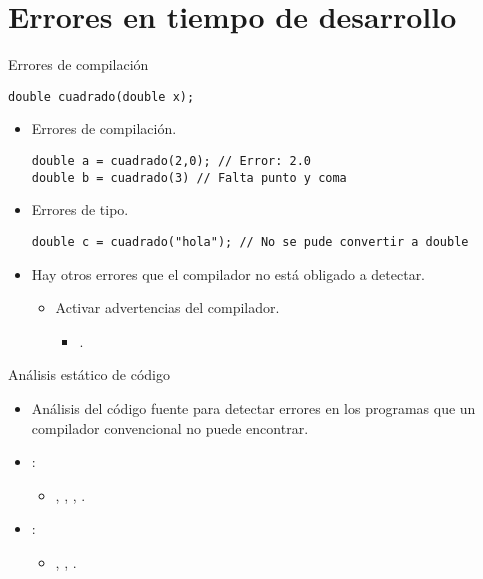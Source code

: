 \section{Errores en tiempo de desarrollo}

\begin{frame}[t,fragile]{Errores de compilación}
\begin{lstlisting}
double cuadrado(double x);
\end{lstlisting}

\begin{itemize}
  \item Errores de compilación.
\begin{lstlisting}
double a = cuadrado(2,0); // Error: 2.0
double b = cuadrado(3) // Falta punto y coma
\end{lstlisting}

  \item Errores de tipo.
\begin{lstlisting}
double c = cuadrado("hola"); // No se pude convertir a double
\end{lstlisting}

  \item Hay otros errores que el compilador no está obligado a detectar.
    \begin{itemize}
      \item Activar advertencias del compilador.
        \begin{itemize}
          \item {}.
        \end{itemize}
    \end{itemize}
\end{itemize}
\end{frame}

\begin{frame}[t]{Análisis estático de código}
\begin{itemize}
  \item Análisis del código fuente para detectar errores en los programas
        que un compilador convencional no puede encontrar.

  \item {}:
    \begin{itemize}
      \item {}, , 
            , .
    \end{itemize}

  \item {}:
    \begin{itemize}
      \item {}, , .
    \end{itemize}
\end{itemize}
\end{frame}

